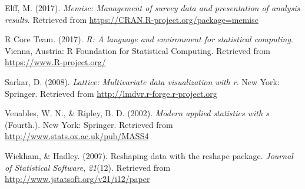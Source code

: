 \documentclass[english,man]{apa6}
\theoremstyle{definition}
\theoremstyle{definition}
\theoremstyle{definition}
\theoremstyle{remark}
\begin{document}
\hypertarget{ref-R-memisc}{}
Elff, M. (2017). \emph{Memisc: Management of survey data and
presentation of analysis results}. Retrieved from
\url{https://CRAN.R-project.org/package=memisc}

\hypertarget{ref-R-base}{}
R Core Team. (2017). \emph{R: A language and environment for statistical
computing}. Vienna, Austria: R Foundation for Statistical Computing.
Retrieved from \url{https://www.R-project.org/}

\hypertarget{ref-R-lattice}{}
Sarkar, D. (2008). \emph{Lattice: Multivariate data visualization with
r}. New York: Springer. Retrieved from
\url{http://lmdvr.r-forge.r-project.org}

\hypertarget{ref-R-MASS}{}
Venables, W. N., \& Ripley, B. D. (2002). \emph{Modern applied
statistics with s} (Fourth.). New York: Springer. Retrieved from
\url{http://www.stats.ox.ac.uk/pub/MASS4}

\hypertarget{ref-R-reshape}{}
Wickham, \& Hadley. (2007). Reshaping data with the reshape package.
\emph{Journal of Statistical Software}, \emph{21}(12). Retrieved from
\url{http://www.jstatsoft.org/v21/i12/paper}
\end{document}
